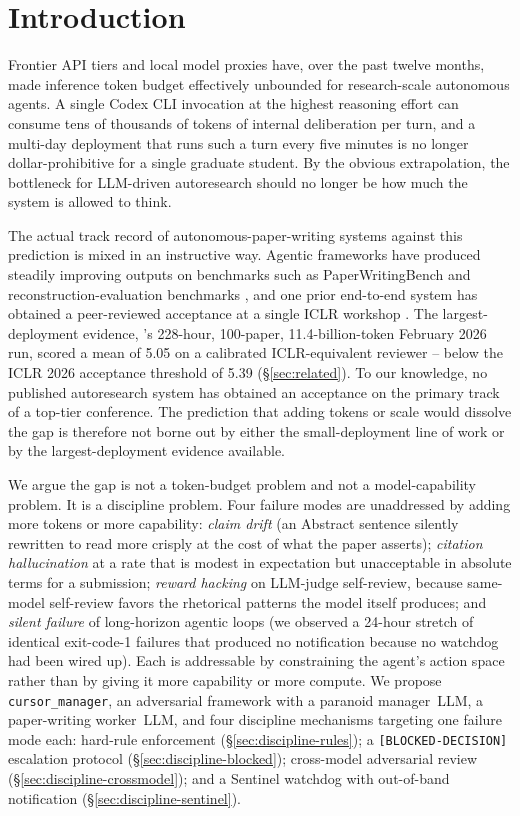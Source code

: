 \section{Introduction}
\label{sec:intro}

Frontier API tiers and local model proxies have, over the past
twelve months, made inference token budget effectively unbounded for
research-scale autonomous agents. A single Codex CLI invocation at the
highest reasoning effort can consume tens of thousands of tokens of
internal deliberation per turn, and a multi-day deployment
that runs such a turn every five minutes is no longer dollar-prohibitive
for a single graduate student. By the obvious extrapolation, the
bottleneck for LLM-driven autoresearch should no longer be how much the
system is allowed to think.

The actual track record of autonomous-paper-writing systems against
this prediction is mixed in an instructive way. Agentic frameworks
have produced steadily improving outputs on benchmarks such as
PaperWritingBench \citep{song2026paperorchestra} and
reconstruction-evaluation benchmarks
\citep{miyai2026paperreconstruction}, and one prior end-to-end system
has obtained a peer-reviewed acceptance at a single ICLR workshop
\citep{yamada2025aiscientistv2}. The largest-deployment evidence,
\citet{fars2026analemma}'s 228-hour, 100-paper, 11.4-billion-token
February 2026 run, scored a mean of 5.05 on a calibrated
ICLR-equivalent reviewer -- below the ICLR 2026 acceptance threshold
of 5.39 (\S\ref{sec:related}). To our knowledge, no published
autoresearch system has obtained an acceptance on the primary track
of a top-tier conference. The prediction that adding tokens or scale
would dissolve the gap is therefore not borne out by either the
small-deployment line of work or by the largest-deployment evidence
available.

We argue the gap is not a token-budget problem and not a
model-capability problem. It is a discipline problem. Four failure
modes are unaddressed by adding more tokens or more capability:
\emph{claim drift} (an Abstract sentence silently rewritten to read
more crisply at the cost of what the paper asserts);
\emph{citation hallucination} at a rate that is modest in expectation
but unacceptable in absolute terms for a submission;
\emph{reward hacking} on LLM-judge self-review, because same-model
self-review favors the rhetorical patterns the model itself produces;
and \emph{silent failure} of long-horizon agentic loops (we observed
a 24-hour stretch of identical exit-code-1 failures that produced no
notification because no watchdog had been wired up). Each is
addressable by constraining the agent's action space rather than by
giving it more capability or more compute. We propose
\texttt{cursor\_manager}, an adversarial framework with a paranoid
manager~LLM, a paper-writing worker~LLM, and four discipline
mechanisms targeting one failure mode each: hard-rule enforcement
(\S\ref{sec:discipline-rules}); a \texttt{[BLOCKED-DECISION]}
escalation protocol (\S\ref{sec:discipline-blocked}); cross-model
adversarial review (\S\ref{sec:discipline-crossmodel}); and a Sentinel
watchdog with out-of-band notification
(\S\ref{sec:discipline-sentinel}).

